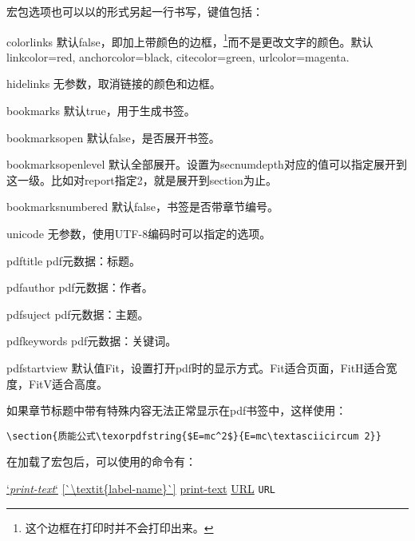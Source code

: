 宏包选项也可以以的形式另起一行书写，键值包括：
\begin{para}
\item[colorlinks] 默认false，即加上带颜色的边框，\footnote{这个边框在打印时并不会打印出来。}而不是更改文字的颜色。默认linkcolor=red, anchorcolor=black, citecolor=green, urlcolor=magenta. 
\item[hidelinks] 无参数，取消链接的颜色和边框。
\item[bookmarks] 默认true，用于生成书签。
\item[bookmarksopen] 默认false，是否展开书签。
\item[bookmarksopenlevel] 默认全部展开。设置为secnumdepth对应的值可以指定展开到这一级。比如对report指定2，就是展开到section为止。
\item[bookmarksnumbered] 默认false，书签是否带章节编号。
\item[unicode] 无参数，使用UTF-8编码时可以指定的选项。
\item[pdftitle] pdf元数据：标题。
\item[pdfauthor] pdf元数据：作者。
\item[pdfsuject] pdf元数据：主题。
\item[pdfkeywords] pdf元数据：关键词。
\item[pdfstartview] 默认值Fit，设置打开pdf时的显示方式。Fit适合页面，FitH适合宽度，FitV适合高度。
\end{para}

如果章节标题中带有特殊内容无法正常显示在pdf书签中，这样使用：

\begin{verbatim}
\section{质能公式\texorpdfstring{$E=mc^2$}{E=mc\textasciicircum 2}}
\end{verbatim}

在加载了宏包后，可以使用的命令有：
\begin{latex}
\hyperref[`\textit{label-name}`]{`\textit{print-text}`}
\autoref{`\textit{label-name}`} %
\href{URL}{print-text}
\url{URL} %
\nolinkurl{URL} %
\end{latex}

